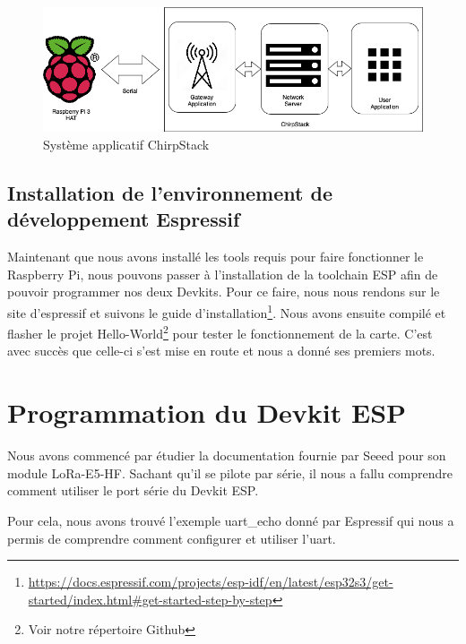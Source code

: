 \documentclass{article}
\begin{document}
				\begin{figure}[H]
					\centering
					\includegraphics[width=0.7\linewidth]{Systeme_ChirpStack}
					\caption{Système applicatif ChirpStack}
					\label{fig:systemechirpstack}
				\end{figure}
				
		\subsection{Installation de l'environnement de développement Espressif}
			Maintenant que nous avons installé les tools requis pour faire fonctionner le Raspberry Pi, nous pouvons passer à l'installation de la toolchain ESP afin de pouvoir programmer nos deux Devkits. 
			\newline
			\newline
			Pour ce faire, nous nous rendons sur le site d'espressif et suivons le guide d'installation\footnote{\url{https://docs.espressif.com/projects/esp-idf/en/latest/esp32s3/get-started/index.html\#get-started-step-by-step}}. 
			\newline
			Nous avons ensuite compilé et flasher le projet Hello-World\footnote{Voir notre répertoire Github} pour tester le fonctionnement de la carte. C'est avec succès que celle-ci s'est mise en route et nous a donné ses premiers mots.
			
	\section{Programmation du Devkit ESP}
		Nous avons commencé par étudier la documentation fournie par Seeed pour son  module LoRa-E5-HF. Sachant qu'il se pilote par série, il nous a fallu comprendre comment utiliser le port série du Devkit ESP.
		
		Pour cela, nous avons trouvé l'exemple uart\_echo donné par Espressif qui nous a permis de comprendre comment configurer et utiliser l'uart.
		
\end{document}
